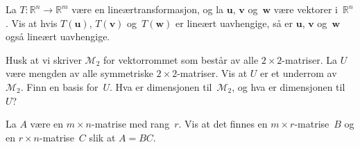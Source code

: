 \documentclass[titlepage,a4paper,12pt,norsk]{IMFeksamen}
\newcommand{\R}{\mathbb{R}}
\newcommand{\M}{\mathcal{M}} %
\newcommand{\V}[1]{\mathbf{#1}}
\renewcommand{\u}{\V{u}}
\renewcommand{\v}{\V{v}}
\newcommand{\w}{\V{w}}
\newcommand{\0}{\V{0}}
\begin{document}
\begin{oppgave}
La $T \colon \R^n \to \R^m$ være en lineærtransformasjon, og la $\u$,
$\v$ og~$\w$ være vektorer i~$\R^n$.  Vis at hvis $T(\u)$, $T(\v)$
og~$T(\w)$ er lineært uavhengige, så er $\u$, $\v$ og~$\w$ også
lineært uavhengige.
\end{oppgave}


\begin{oppgave}
Husk at vi skriver $\M_2$ for vektorrommet som består av alle $2 \times 2$-matriser.
La $U$ være mengden av alle symmetriske $2 \times 2$-matriser.
Vis at $U$ er et underrom av~$\M_2$.
Finn en basis for~$U$.  Hva er dimensjonen til~$\M_2$, og hva er dimensjonen til~$U$?
\end{oppgave}


\begin{oppgave}
La $A$ være en $m \times n$-matrise med rang~$r$.
Vis at det finnes en $m \times r$-matrise~$B$ og
en $r \times n$-matrise~$C$
slik at $A = BC$.
\end{oppgave}
\end{document}
